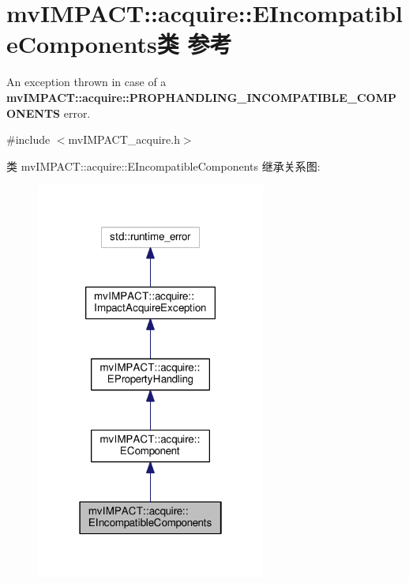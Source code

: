 \hypertarget{classmv_i_m_p_a_c_t_1_1acquire_1_1_e_incompatible_components}{\section{mv\+I\+M\+P\+A\+C\+T\+:\+:acquire\+:\+:E\+Incompatible\+Components类 参考}
\label{classmv_i_m_p_a_c_t_1_1acquire_1_1_e_incompatible_components}
}


An exception thrown in case of a {\bfseries mv\+I\+M\+P\+A\+C\+T\+::acquire\+::\+P\+R\+O\+P\+H\+A\+N\+D\+L\+I\+N\+G\+\_\+\+I\+N\+C\+O\+M\+P\+A\+T\+I\+B\+L\+E\+\_\+\+C\+O\+M\+P\+O\+N\+E\+N\+T\+S} error.  




{\ttfamily \#include $<$mv\+I\+M\+P\+A\+C\+T\+\_\+acquire.\+h$>$}



类 mv\+I\+M\+P\+A\+C\+T\+:\+:acquire\+:\+:E\+Incompatible\+Components 继承关系图\+:
\nopagebreak
\begin{figure}[H]
\begin{center}
\leavevmode
\includegraphics[width=214pt]{classmv_i_m_p_a_c_t_1_1acquire_1_1_e_incompatible_components__inherit__graph}
\end{center}
\end{figure}


